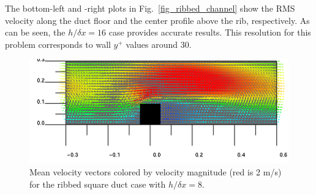 \documentclass[11pt]{book}
\begin{document}
The bottom-left and -right plots in Fig.~\ref{fig_ribbed_channel} show the RMS velocity along the duct floor and the center profile above the rib, respectively. As can be seen, the $h/\delta x = 16$ case provides accurate results.  This resolution for this problem corresponds to wall $y^+$ values around 30.

\begin{figure}[h]
   \begin{center}
      \includegraphics[width=.8\textwidth]{SCRIPT_FIGURES/ribbed_channel_80_s1000}
      \caption[Mean velocity vectors for ribbed square duct flow]{\label{fig_ribbed_channel_image} Mean velocity vectors colored by velocity magnitude (red is 2 m/s) for the ribbed square duct case with $h/\delta x = 8$.}
   \end{center}
\end{figure}
\end{document}

